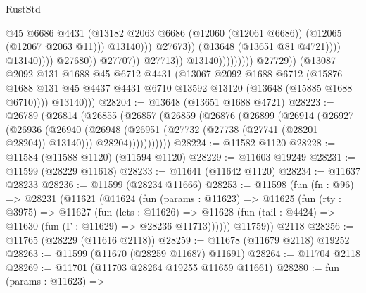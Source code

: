 \begin{lexlean}{RustStd}
\begin{coremodule}
                                                                @45
                                                                @6686
                                                                @4431
                                                                (@13182
                                                                  @2063
                                                                  @6686
                                                                  (@12060 (@12061 @6686))
                                                                  (@12065 (@12067 @2063 @11)))
                                                                @13140)))
                                                          @27673))
                                                      (@13648 (@13651 @81 @4721))))
                                                  @13140))))
                                          @27680))
                                      @27707))
                                  @27713))
                              @13140)))))))))
            @27729))
        (@13087
          @2092
          @131
          @1688
          @45
          @6712
          @4431
          (@13067
            @2092
            @1688
            @6712
            (@15876 @1688 @131 @45 @4437 @4431 @6710 @13592 @13120 (@13648 (@15885 @1688 @6710))))
          @13140)))
@28204 := @13648 (@13651 @1688 @4721)
@28223 := @26789
    (@26814
      (@26855
        (@26857
          (@26859
            (@26876
              (@26899
                (@26914
                  (@26927
                    (@26936
                      (@26940
                        (@26948
                          (@26951 (@27732 (@27738 (@27741 (@28201 @28204)) @13140)))
                          @28204)))))))))))
@28224 := @11582 @1120
@28228 := @11584 (@11588 @1120) (@11594 @1120)
@28229 := @11603 @19249
@28231 := @11599 (@28229 @11618)
@28233 := @11641 (@11642 @1120)
@28234 := @11637 @28233
@28236 := @11599 (@28234 @11666)
@28253 := @11598
    (fun (fn : @96) =>
    @28231
      (@11621
        (@11624
          (fun (params : @11623) =>
          @11625
            (fun (rty : @3975) =>
            @11627
              (fun (lets : @11626) =>
              @11628 (fun (tail : @4424) => @11630 (fun (Γ : @11629) => @28236 @11713))))))
        @11759))
    @2118
@28256 := @11765 (@28229 (@11616 @2118))
@28259 := @11678 (@11679 @2118) @19252
@28263 := @11599 (@11670 (@28259 @11687) @11691)
@28264 := @11704 @2118
@28269 := @11701 (@11703 @28264 @19255 @11659 @11661)
@28280 := fun (params : @11623) =>

\end{coremodule}
\end{lexlean}
